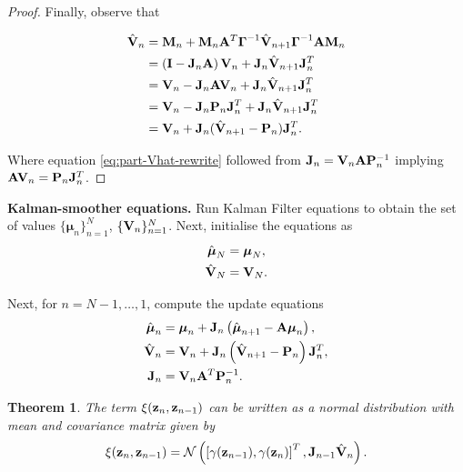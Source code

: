 \documentclass[11pt]{article}
\numberwithin{equation}{section}
\newcommand{\z}{{\bf z}}
\newcommand{\N}{\mathcal{N}}
\newtheorem{theorem}{Theorem}[section]
\begin{document}
\begin{proof}
	Finally, observe that 
	
	\begin{align}
		\hat{{\bf V}}_n
		&= {\bf M}_n + {\bf M}_n {\bf A}^T \boldsymbol{\Gamma}^{-1} \hat{\bf V}_{n+1}\boldsymbol\Gamma^{-1}{\bf A}{\bf M}_n\\
		&= \left({\bf I} - {\bf J}_n{\bf A}\right){\bf V}_n + {\bf J}_n\hat{\bf V}_{n+1}{\bf J}_n^T\\
		&= {\bf V}_n - {\bf J}_n{\bf A}{\bf V}_n + {\bf J}_n\hat{\bf V}_{n+1}{\bf J}_n^T\\
		&= {\bf V}_n - {\bf J}_n{\bf P}_n{\bf J}_n^T + {\bf J}_n\hat{\bf V}_{n+1}{\bf J}_n^T \label{eq:part-Vhat-rewrite} \\
		&= {\bf V}_n + {\bf J}_n(\hat{\bf V}_{n+1} - {\bf P}_n){\bf J}_n^T.\\
	\end{align}
	
	Where equation \eqref{eq:part-Vhat-rewrite} followed from ${\bf J}_n = {\bf V}_n{\bf A}{\bf P}_n^{-1}$ implying ${\bf AV}_n = {\bf P}_n{\bf J}_n^T$.
\end{proof}

\begin{tcolorbox}
\textbf{Kalman-smoother equations.}
	Run Kalman Filter equations to obtain the set of values $\{\boldsymbol\mu_n\}_{n=1}^N$, $\{{\bf V}_n\}_{n=1}^N$. Next, initialise the equations as
	\begin{align}
		\hat{\boldsymbol{\mu}}_N &= \boldsymbol{\mu}_N,\\
		\hat{{\bf V}}_N &= {\bf V}_N.
	\end{align}

	Next, for $n=N-1, \ldots, 1$, compute the update equations
	\begin{align}
		\hat{\boldsymbol{\mu}}_n &= \boldsymbol{\mu}_n + {\bf J}_n\left(\hat{\boldsymbol \mu}_{n+1} - {\bf A}\boldsymbol\mu_n\right),\\
		\hat{\bf V}_n &= {\bf V}_n + {\bf J}_n\left(\hat{\bf V}_{n+1} - {\bf P}_n\right){\bf J}_n^T,\\
		{\bf J}_n &= {\bf V}_n{\bf A}^T{\bf P}_n^{-1}.
	\end{align}
\end{tcolorbox}

\begin{theorem}
	The term $\xi(\z_n, \z_{n-1})$ can be written as a normal distribution with mean and covariance matrix given by
	\begin{equation}
		\xi(\z_n, \z_{n-1}) = \N\left(\left[\gamma(\z_{n-1}), \gamma(\z_{n})\right]^T, {\bf J}_{n-1}\hat{\bf V}_{n}\right).
	\end{equation}
\end{theorem}
\end{document}
